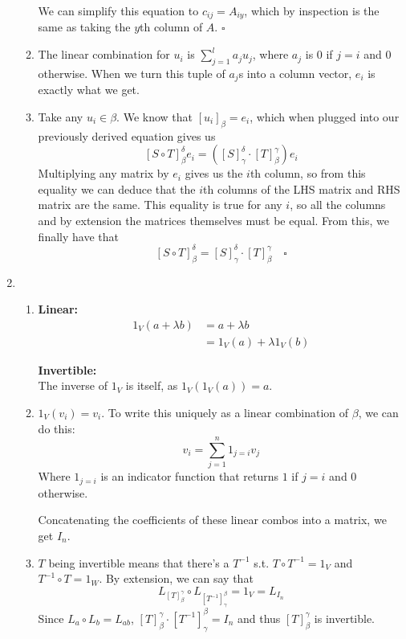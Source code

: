 \documentclass[12pt]{article}
\begin{document}
\begin{enumerate}
\begin{enumerate}
                        We can simplify this equation to $c_{ij}=A_{iy}$,
                        which by inspection is the same as taking the $y$th column of $A$. $\square$
                  \item The linear combination for $u_i$ is $\sum_{j=1}^{l} a_j u_j$, where $a_j$ is $0$ if $j=i$ and $0$ otherwise.
                        When we turn this tuple of $a_j$s into a column vector, $e_i$ is exactly what we get.
                  \item Take any $u_i \in \beta$. We know that $[u_i]_\beta=e_i$, which when plugged into our previously derived equation gives us
                        \[[S \circ T]^\delta_\beta e_i = \left([S]^\delta_\gamma \cdot [T]^\gamma_\beta\right)e_i\]
                        Multiplying any matrix by $e_i$ gives us the $i$th column, so from this equality
                        we can deduce that the $i$th columns of the LHS matrix and RHS matrix are the same.
                        This equality is true for any $i$, so all the columns and by extension the matrices themselves must be equal.
                        From this, we finally have that
                        \[[S \circ T]^\delta_\beta = [S]^\delta_\gamma \cdot [T]^\gamma_\beta\quad\square\]
            \end{enumerate}
            \pagebreak
      \item \begin{enumerate}
                  \item \textbf{Linear:} \begin{align*}
                              1_V(a+\lambda b) & =a+\lambda b           \\
                                               & =1_V(a)+\lambda 1_V(b)
                        \end{align*}

                        \textbf{Invertible:} \\
                        The inverse of $1_V$ is itself, as $1_V(1_V(a))=a$.
                  \item $1_V(v_i)=v_i$.
                        To write this uniquely as a linear combination of $\beta$, we can do this:
                        \[v_i=\sum_{j=1}^{n} \mathrm{1}_{j=i}v_j\]
                        Where $\mathrm{1}_{j=i}$ is an indicator function that returns $1$ if $j=i$ and $0$ otherwise.

                        Concatenating the coefficients of these linear combos into a matrix, we get $I_n$.
                  \item $T$ being invertible means that there's a $T^{-1}$ s.t. $T \circ T^{-1}=1_V$ and $T^{-1} \circ T=1_W$.
                  By extension, we can say that
                  \[L_{[T]^\gamma_\beta} \circ L_{[T^{-1}]^\beta_\gamma}=1_V=L_{I_n}\]
                  Since $L_a \circ L_b=L_{ab}$, $[T]^\gamma_\beta \cdot [T^{-1}]^\beta_\gamma=I_n$ and thus $[T]^\gamma_\beta$ is invertible.
            \end{enumerate}
\end{enumerate}
\end{document}
